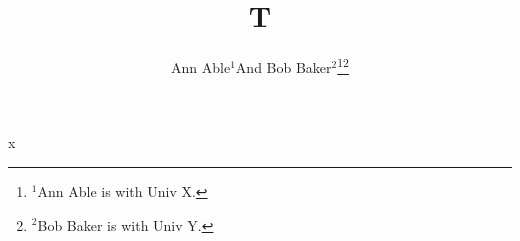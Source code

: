 \documentclass{article}
\begin{document}
\title{T}
\author{Ann Able$^{1}$And Bob Baker$^{2}$\thanks{$^{1}$Ann Able is with Univ X.}\thanks{$^{2}$Bob Baker is with Univ Y.}}
\maketitle
x
\end{document}
